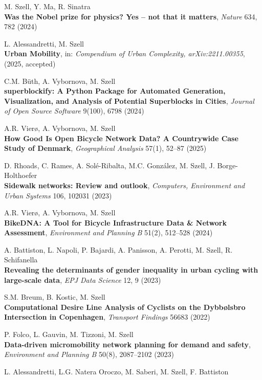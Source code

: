 \documentclass[10pt,a4paper]{article}
\begin{document}
\begin{etaremune}
\item M. Szell, Y. Ma, R. Sinatra\\
    \textbf{Was the Nobel prize for physics? Yes -- not that it matters},
    \textit{Nature} 634, 782 (2024)
\item L. Alessandretti, M. Szell\\
    \textbf{Urban Mobility}, in: \textit{Compendium of Urban Complexity, arXiv:2211.00355}, (2025, accepted)
\item C.M. Büth, A. Vybornova, M. Szell\\
    \textbf{superblockify: A Python Package for Automated Generation, Visualization, and Analysis of Potential Superblocks in Cities}, 
    \textit{Journal of Open Source Software} 9(100), 6798 (2024)
\item A.R. Vierø, A. Vybornova, M. Szell\\
    \textbf{How Good Is Open Bicycle Network Data? A Countrywide Case Study of Denmark}, \textit{Geographical Analysis} 57(1), 52--87 (2025)
\item D. Rhoads, C. Rames, A. Solé-Ribalta, M.C. González, M. Szell, J. Borge-Holthoefer\\
    \textbf{Sidewalk networks: Review and outlook},
    \textit{Computers, Environment and Urban Systems} 106, 102031 (2023)
\item A.R. Vierø, A. Vybornova, M. Szell\\
    \textbf{BikeDNA: A Tool for Bicycle Infrastructure Data \& Network Assessment},
    \textit{Environment and Planning B} 51(2), 512--528 (2024)
\item A. Battiston, L. Napoli, P. Bajardi, A. Panisson, A. Perotti, M. Szell, R. Schifanella\\
    \textbf{Revealing the determinants of gender inequality in urban cycling with large-scale data}, 
    \textit{EPJ Data Science} 12, 9 (2023)
\item S.M. Breum, B. Kostic, M. Szell\\
    \textbf{Computational Desire Line Analysis of Cyclists on the Dybbølsbro Intersection in Copenhagen}, \textit{Transport Findings} 56683 (2022)
\item P. Folco, L. Gauvin, M. Tizzoni, M. Szell\\
    \textbf{Data-driven micromobility network planning for demand and safety}, \textit{Environment and Planning B} 50(8), 2087--2102 (2023)
\item L. Alessandretti, L.G. Natera Oroczo, M. Saberi, M. Szell, F. Battiston\\

\end{etaremune}
\end{document}
